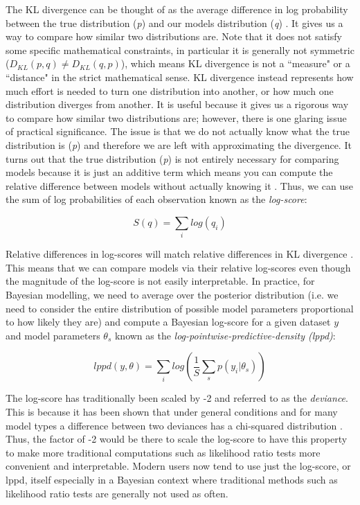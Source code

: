 The KL divergence can be thought of as the average difference in log probability between the true distribution (\textit{p}) and our models distribution (\textit{q}) \cite{McElreath2020}. It gives us a way to compare how similar two distributions are. Note that it does not satisfy some specific mathematical constraints, in particular it is generally not symmetric ($D_{KL}(p,q) \neq D_{KL}(q,p)$), which means KL divergence is not a ``measure" or a ``distance" in the strict mathematical sense. KL divergence instead represents how much effort is needed to turn one distribution into another, or how much one distribution diverges from another. It is useful because it gives us a rigorous way to compare how similar two distributions are; however, there is one glaring issue of practical significance. The issue is that we do not actually know what the true distribution is (\textit{p}) and therefore we are left with approximating the divergence. It turns out that the true distribution (\textit{p}) is not entirely necessary for comparing models because it is just an additive term which means you can compute the relative difference between models without actually knowing it \cite{McElreath2020}. Thus, we can use the sum of log probabilities of each observation known as the \textit{log-score}:

\begin{equation} \label{eq:log-score}
S(q) = \sum_i log(q_i)
\end{equation}

Relative differences in log-scores will match relative differences in KL divergence \cite{McElreath2020}. This means that we can compare models via their relative log-scores even though the magnitude of the log-score is not easily interpretable. In practice, for Bayesian modelling, we need to average over the posterior distribution (i.e. we need to consider the entire distribution of possible model parameters proportional to how likely they are) and compute a Bayesian log-score for a given dataset $y$ and model parameters $\theta_s$ known as the \textit{log-pointwise-predictive-density (lppd)}:

\begin{equation} \label{eq:lppd}
lppd(y, \theta) = \sum_i log \left( \frac{1}{S} \sum_s p(y_i | \theta_s) \right)
\end{equation}

The log-score has traditionally been scaled by -2 and referred to as the \textit{deviance}. This is because it has been shown that under general conditions and for many model types a difference between two deviances has a chi-squared distribution \cite{Dunn2018}. Thus, the factor of -2 would be there to scale the log-score to have this property to make more traditional computations such as likelihood ratio tests more convenient and interpretable. Modern users now tend to use just the log-score, or lppd, itself especially in a Bayesian context where traditional methods such as likelihood ratio tests are generally not used as often.

